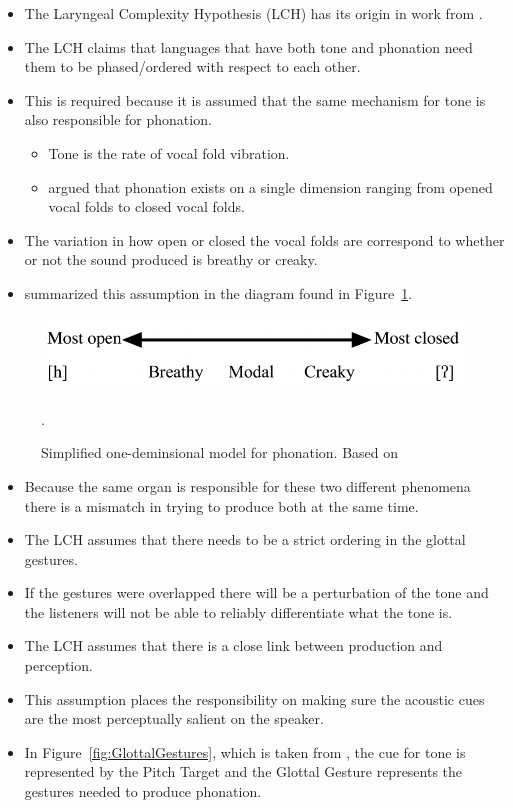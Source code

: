 \documentclass[12pt, letterpaper]{article}
\begin{document}
\begin{itemize}
	\item The Laryngeal Complexity Hypothesis (LCH) has its origin in work from \citet{silvermanLaryngealComplexityOtomanguean1997,blankenshipTimeCourseBreathiness1997,blankenshipTimingNonmodalPhonation2002}.
	\item The LCH claims that languages that have both tone and phonation need them to be phased/ordered with respect to each other. 
	\item This is required because it is assumed that the same mechanism for tone is also responsible for phonation. 
	\begin{itemize}
		\item Tone is the rate of vocal fold vibration. 
		\item \citet{ladefogedPreliminariesLinguisticPhonetics1971,gordonPhonationTypesCrosslinguistic2001} argued that phonation exists on a single dimension ranging from opened vocal folds to closed vocal folds. 
	\end{itemize} 
	\item The variation in how open or closed the vocal folds are correspond to whether or not the sound produced is breathy or creaky. 
	\item \citet{ladefogedPreliminariesLinguisticPhonetics1971,gordonPhonationTypesCrosslinguistic2001} summarized this assumption in the diagram found in Figure~\ref{fig:Phonation}.
\end{itemize}
\begin{figure}[!h]
	\centering
	\includegraphics[width=.6\textwidth]{../Phonation.png}
	\caption{Simplified one-deminsional model for phonation. Based on \citet{ladefogedPreliminariesLinguisticPhonetics1971,gordonPhonationTypesCrosslinguistic2001}}.
	\label{fig:Phonation}
\end{figure}
\vspace{-2ex}
\begin{itemize}
	\item Because the same organ is responsible for these two different phenomena there is a mismatch in trying to produce both at the same time. 
	\item The LCH assumes that there needs to be a strict ordering in the glottal gestures. 
	\item If the gestures were overlapped there will be a perturbation of the tone and the listeners will not be able to reliably differentiate what the tone is.
	\item The LCH assumes that there is a close link between production and perception. 
	\item This assumption places the responsibility on making sure the acoustic cues are the most perceptually salient on the speaker. 
	\item In Figure~\ref{fig:GlottalGestures}, which is taken from \citet{dicanioCoarticulationToneGlottal2012}, the cue for tone is represented by the Pitch Target and the Glottal Gesture represents the gestures needed to produce phonation. 
\end{itemize}
\end{document}
